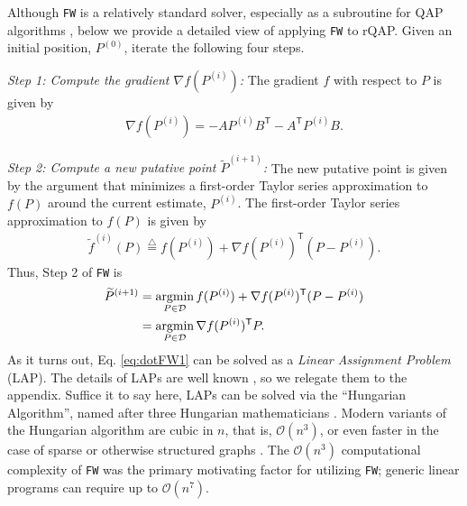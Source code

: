 \documentclass[11pt]{article}
\newcommand{\defn}{\overset{\triangle}{=}}
\newcommand{\argmin}{\operatornamewithlimits{argmin}}
\newcommand{\T}{^{\ensuremath{\mathsf{T}}}}           %
\providecommand{\mc}[1]{\mathcal{#1}}
\providecommand{\mt}[1]{\widetilde{#1}}
\begin{document}
Although \texttt{FW} is a relatively standard solver, especially as a subroutine for QAP algorithms \cite{Anstreicher03}, below we provide a detailed view of applying \texttt{FW} to rQAP.
Given an initial position, $P^{(0)}$, iterate the following four steps.

\emph{Step 1: Compute the gradient $\nabla f(P^{(i)})$:}  The gradient $f$ with respect to $P$ is given by
\begin{align} \label{eq:grad}
	\nabla f (P^{(i)}) = 
	  - A P^{(i)} B\T - A\T P^{(i)} B.
\end{align}


\emph{Step 2: Compute a new putative point $\mt{P}^{(i+1)}$:} The new putative point is given by the argument that minimizes a first-order Taylor series approximation to $f(P)$ around the current estimate, $P^{(i)}$. The first-order Taylor series approximation to $f(P)$ is given by
\begin{align}
	\mt{f}^{(i)}(P) \defn f(P^{(i)}) + \nabla f(P^{(i)})\T(P - P^{(i)}).
\end{align}
Thus, Step 2 of \texttt{FW} is
\begin{subequations} \label{eq:FW1}
\begin{align}
	\mt{P}^{(i+1)} &= \argmin_{P \in \mc{D}} f(P^{(i)}) + \nabla f(P^{(i)})\T(P - P^{(i)}) 
	\\ &=\argmin_{P \in \mc{D}} \nabla f(P^{(i)})\T P. \label{eq:dotFW1}
\end{align}
\end{subequations}
As it turns out, Eq.  \eqref{eq:dotFW1} can be solved as a \emph{Linear Assignment Problem} (LAP).  The details of LAPs are well known \cite{Burkard2009}, so we relegate them to the appendix.  Suffice it to say here, LAPs can be solved via  the ``Hungarian Algorithm'', named after three Hungarian mathematicians \cite{Kuhn1955, Konig1931, Egevary1931}.  Modern variants of the Hungarian algorithm are cubic in $n$, that is, $\mc{O}(n^3)$, or even faster in the case of sparse or otherwise structured graphs \cite{Jonker1987, Burkard2009}.  The $\mc{O}(n^3)$ computational complexity of \texttt{FW} was the primary motivating factor for utilizing \texttt{FW}; generic linear programs can require up to $\mc{O}(n^7)$.
\end{document}
